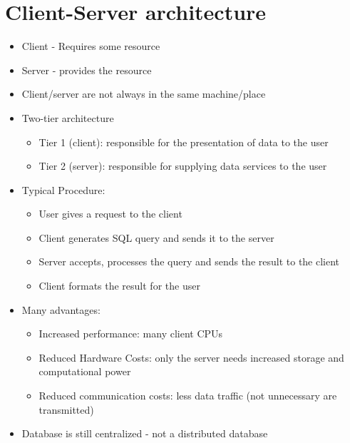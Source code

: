 \documentclass{article}[18pt]
\begin{document}
\section{Client-Server architecture}
\begin{itemize}
	\item Client - Requires some resource
	\item Server - provides the resource
	\item Client/server are not always in the same machine/place
	\item Two-tier architecture
	\begin{itemize}
		\item Tier 1 (client): responsible for the presentation of data to the user
		\item Tier 2 (server): responsible for supplying data services to the user
	\end{itemize}
	\item Typical Procedure:
	\begin{itemize}
		\item User gives a request to the client
		\item Client generates SQL query and sends it to the server
		\item Server accepts, processes the query and sends the result to the client
		\item Client formats the result for the user
	\end{itemize}
	\item Many advantages:
	\begin{itemize}
		\item Increased performance: many client CPUs
		\item Reduced Hardware Costs: only the server needs increased storage and computational power
		\item Reduced communication costs: less data traffic (not unnecessary are transmitted)
	\end{itemize}
	\item Database is still centralized - not a distributed database
\end{itemize}
\end{document}
